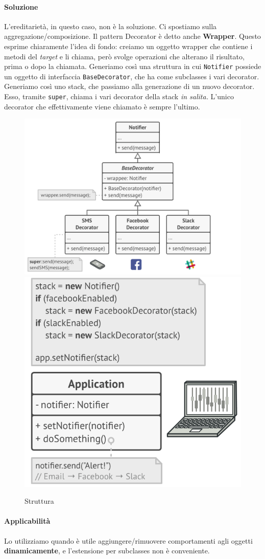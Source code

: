\documentclass[11pt]{article}
\newcommand{\code}[1]{\texttt{#1}}
\begin{document}
\paragraph{Soluzione}
L'ereditarietà, in questo caso, non è la soluzione. Ci spostiamo sulla aggregazione/composizione. Il pattern Decorator è detto anche \textbf{Wrapper}. Questo esprime chiaramente l'idea di fondo: creiamo un oggetto wrapper che contiene i metodi del \textit{target} e li chiama, però svolge operazioni che alterano il risultato, prima o dopo la chiamata. Generiamo così una struttura in cui \code{Notifier} possiede un oggetto di interfaccia \code{BaseDecorator}, che ha come subclasses i vari decorator. Generiamo così uno stack, che passiamo alla generazione di un nuovo decorator. Esso, tramite \code{super}, chiama i vari decorator della stack \textit{in salita.} L'unico decorator che effettivamente viene chiamato è sempre l'ultimo. 
\begin{figure}[H]
    \includegraphics[width=0.5\linewidth]{res/teoria/Decorator1.png}
    \includegraphics[width=0.5\linewidth]{res/teoria/Decorator2.png}
    \caption{Struttura}
\end{figure}
\paragraph{Applicabilità}
Lo utilizziamo quando è utile aggiungere/rimuovere comportamenti agli oggetti \textbf{dinamicamente}, e l'estensione per subclasses non è conveniente.
\end{document}
